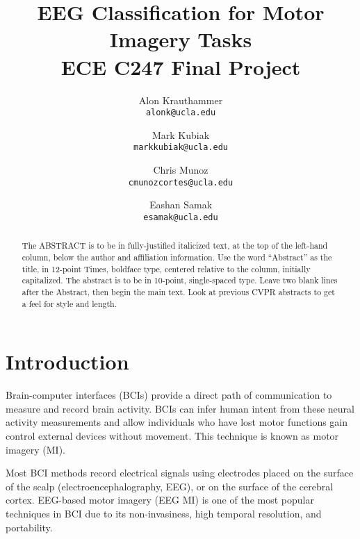 \documentclass[10pt,twocolumn,letterpaper]{article}
\begin{document}
\title{
    EEG Classification for Motor Imagery Tasks\\
    {\large ECE C247 Final Project}
}

\author{Alon Krauthammer\\
{\tt\small alonk@ucla.edu}
\and
Mark Kubiak\\
{\tt\small markkubiak@ucla.edu}
\and
Chris Munoz\\
{\tt\small cmunozcortes@ucla.edu}
\and
Eashan Samak\\
{\tt\small esamak@ucla.edu}
}

\maketitle

\begin{abstract}
   The ABSTRACT is to be in fully-justified italicized text, at the top
   of the left-hand column, below the author and affiliation
   information. Use the word ``Abstract'' as the title, in 12-point
   Times, boldface type, centered relative to the column, initially
   capitalized. The abstract is to be in 10-point, single-spaced type.
   Leave two blank lines after the Abstract, then begin the main text.
   Look at previous CVPR abstracts to get a feel for style and length.
\end{abstract}

\section{Introduction}
Brain-computer interfaces (BCIs) provide a direct path of communication to
measure and record brain activity. BCIs can infer human intent from these
neural activity measurements and allow individuals who have lost motor
functions gain control external devices without movement. %
This technique is known as motor imagery (MI).

Most BCI methods record electrical signals using electrodes
placed on the surface of the scalp (electroencephalography, EEG), or on the
surface of the cerebral cortex. EEG-based motor imagery (EEG MI) is one of the
most popular techniques in BCI due to its non-invasiness, high temporal
resolution, and portability. %
\end{document}
